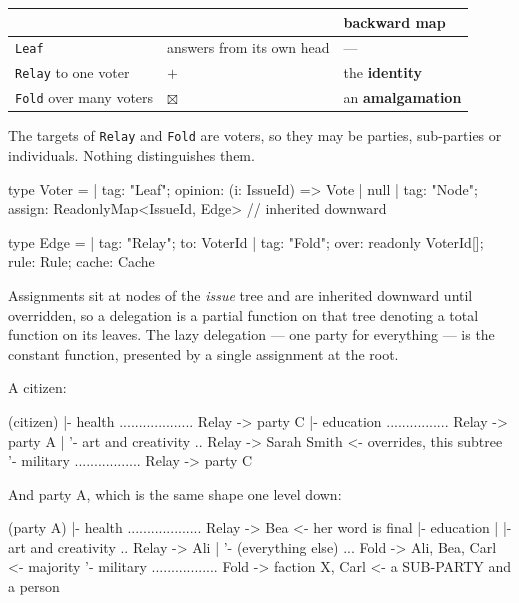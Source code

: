 \documentclass[11pt,a4paper]{article}
\begin{document}
\begin{center}
\begin{tabular}{@{}lll@{}}
\toprule
& & backward map \\
\midrule
\texttt{Leaf} & answers from its own head & --- \\
\texttt{Relay} to one voter & $+$ & the \textbf{identity} \\
\texttt{Fold} over many voters & $\boxtimes$ & an \textbf{amalgamation} \\
\bottomrule
\end{tabular}
\end{center}

The targets of \texttt{Relay} and \texttt{Fold} are voters, so they may be
parties, sub-parties or individuals. Nothing distinguishes them.

\begin{term}
type Voter =
  | { tag: "Leaf"; opinion: (i: IssueId) => Vote | null }
  | { tag: "Node"; assign: ReadonlyMap<IssueId, Edge> }   // inherited downward

type Edge =
  | { tag: "Relay"; to: VoterId }
  | { tag: "Fold";  over: readonly VoterId[]; rule: Rule; cache: Cache }
\end{term}

Assignments sit at nodes of the \emph{issue} tree and are inherited downward
until overridden, so a delegation is a partial function on that tree denoting a
total function on its leaves. The lazy delegation --- one party for everything ---
is the constant function, presented by a single assignment at the root.

A citizen:

\begin{term}
  (citizen)
  |- health ................... Relay -> party C
  |- education ................ Relay -> party A
  |    '- art and creativity .. Relay -> Sarah Smith     <- overrides, this subtree
  '- military ................. Relay -> party C
\end{term}

And party A, which is the same shape one level down:

\begin{term}
  (party A)
  |- health ................... Relay -> Bea             <- her word is final
  |- education
  |    |- art and creativity .. Relay -> Ali
  |    '- (everything else) ... Fold  -> Ali, Bea, Carl  <- majority
  '- military ................. Fold  -> faction X, Carl <- a SUB-PARTY and a person
\end{term}
\end{document}
